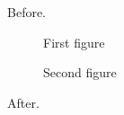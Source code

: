 Before.

\begin{island}
\begin{figure}
\caption{First figure}
\label{fig:first}
\end{figure}

\begin{figure}
\ContinuedFloat
\caption{Second figure}
\label{fig:second}
\end{figure}
\end{island}

After.
